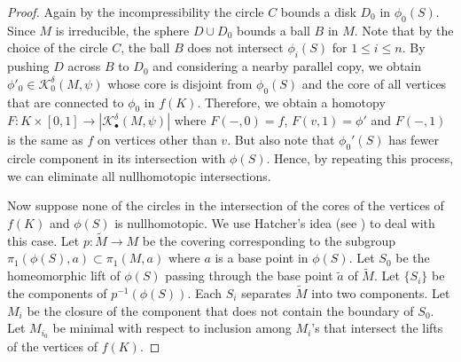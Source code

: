 \documentclass[a4paper]{amsart}
\theoremstyle{definition}
\theoremstyle{remark}
\numberwithin{equation}{section}
\begin{document}
\begin{proof}
Again by the incompressibility the circle $C$ bounds a disk $D_0$ in $\phi_0(S)$. Since $M$ is irreducible, the sphere $D\cup D_0$ bounds a ball $B$ in $M$. Note that by the choice of the circle $C$, the ball $B$ does not intersect $\phi_i(S)$ for $1\leq i\leq n$. By pushing $D$ across $B$ to $D_0$ and considering a nearby parallel copy, we obtain $\phi'_0\in \mathcal{K}^{\delta}_{0}(M,\psi)$ whose core is disjoint from $\phi_0(S)$ and the core of all vertices that are connected to $\phi_0$ in $f(K)$. Therefore, we obtain a homotopy $F:K\times [0,1]\to |\mathcal{K}^{\delta}_{\bullet}(M,\psi)|$ where $F(-,0)=f$, $F(v,1)=\phi'$  and $F(-,1)$ is the same as $f$ on vertices other than $v$. But also note that $\phi_0'(S)$ has fewer circle component in its intersection with $\phi(S)$. Hence, by repeating this process, we can eliminate all nullhomotopic intersections. 
%

 Now suppose none of the circles in the intersection of the cores of the vertices of $f(K)$ and $\phi(S)$ is nullhomotopic. We use Hatcher's idea (see \cite[Page 342]{MR0420620}) to deal with this case. Let $p:\tilde{M}\to M$ be the covering corresponding to the subgroup $\pi_1(\phi(S),a)\subset \pi_1(M,a)$ where $a$ is a base point in $\phi(S)$. Let $S_0$ be the homeomorphic lift of $\phi(S)$ passing through the base point $\tilde{a}$ of $\tilde{M}$. Let $\{ S_i\}$ be the components of $p^{-1}(\phi(S))$. Each $S_i$ separates $\tilde{M}$ into two components. Let $M_i$ be the closure of the component that does not contain the boundary of $S_0$. Let $M_{i_0}$ be minimal with respect to inclusion among $M_i$'s that intersect the lifts of the vertices of $f(K)$. 


\end{proof}
\end{document}
